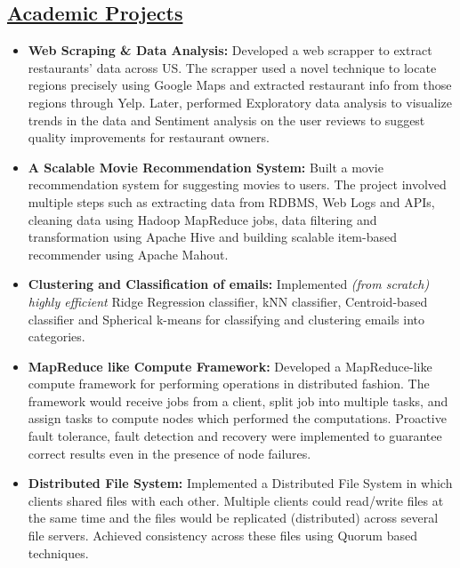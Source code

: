 \documentclass[10pt]{article}
\begin{document}
\subsection*{\underline{Academic Projects}}
\vspace{-0.1cm}
\begin{itemize}[leftmargin=0.15in]
\setlength{\itemsep}{0pt}%
\item {\bfseries Web Scraping \& Data Analysis:} Developed a web scrapper to extract restaurants' data across US. The scrapper used a novel technique to locate regions precisely using Google Maps and extracted restaurant info from those regions through Yelp. Later, performed Exploratory data analysis to visualize trends in the data and Sentiment analysis on the user reviews to suggest quality improvements for restaurant owners.

\item {\bfseries A Scalable Movie Recommendation System:} Built a movie recommendation system for suggesting movies to users. The project involved multiple steps such as extracting data from RDBMS, Web Logs and APIs, cleaning data using Hadoop MapReduce jobs, data filtering and transformation using Apache Hive and building scalable item-based recommender using Apache Mahout.

\item {\bfseries Clustering and Classification of emails:} Implemented  \textit{(from scratch) highly efficient} Ridge Regression classifier, kNN classifier, Centroid-based classifier and Spherical k-means for classifying and clustering emails into categories.

\item {\bfseries MapReduce like Compute Framework:} Developed a MapReduce-like compute framework for performing operations in distributed fashion. The framework would receive jobs from a client, split job into multiple tasks, and assign tasks to compute nodes which performed the computations. Proactive fault tolerance, fault detection and recovery were implemented to guarantee correct results even in the presence of node failures.

\item {\bfseries Distributed File System:} Implemented a Distributed File System in which clients shared files with each other. Multiple clients could read/write files at the same time and the files would be replicated (distributed) across several file servers. Achieved consistency across these files using Quorum based techniques.

\end{itemize}
\end{document}
